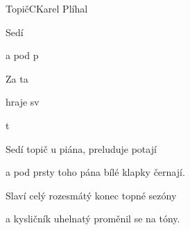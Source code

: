\setcounter{page}{88}
\begin{song}{Topič}{C}{Karel Plíhal}

\begin{SBVerse}

Sedí 

a pod p

Za ta 

hraje sv

\end{SBVerse}

\begin{SBChorus}


t

\end{SBChorus}

\begin{SBVerse}

Sedí topič u piána, preluduje potají

a pod prsty toho pána bílé klapky černají.

Slaví celý rozesmátý konec topné sezóny

a kysličník uhelnatý proměnil se na tóny.

\end{SBVerse}

\end{song}

\pagebreak
